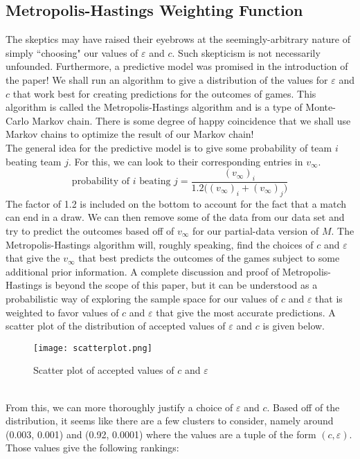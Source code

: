 \documentclass[10pt]{article}
\begin{document}
\subsection{Metropolis-Hastings Weighting Function}
The skeptics may have raised their eyebrows at the seemingly-arbitrary nature of simply ``choosing" our values of $\varepsilon$ and $c$. Such skepticism is not necessarily unfounded. Furthermore, a predictive model was promised in the introduction of the paper! We shall run an algorithm to give a distribution of the values for $\varepsilon$ and $c$ that work best for creating predictions for the outcomes of games. This algorithm is called the Metropolis-Hastings algorithm and is a type of Monte-Carlo Markov chain. There is some degree of happy coincidence that we shall use Markov chains to optimize the result of our Markov chain!\vspace{0.5cm}\\
The general idea for the predictive model is to give some probability of team $i$ beating team $j$. For this, we can look to their corresponding entries in $v_\infty$.
\[\text{probability of $i$ beating $j$} = \frac{(v_\infty)_i}{1.2\big((v_\infty)_i + (v_\infty)_j\big)}\]
The factor of 1.2 is included on the bottom to account for the fact that a match can end in a draw. We can then remove some of the data from our data set and try to predict the outcomes based off of $v_\infty$ for our partial-data version of $M$. The Metropolis-Hastings algorithm will, roughly speaking, find the choices of $c$ and $\varepsilon$ that give the $v_\infty$ that best predicts the outcomes of the games subject to some additional prior information. A complete discussion and proof of Metropolis-Hastings is beyond the scope of this paper, but it can be understood as a probabilistic way of exploring the sample space for our values of $c$ and $\varepsilon$ that is weighted to favor values of $c$ and $\varepsilon$ that give the most accurate predictions. A scatter plot of the distribution of accepted values of $\varepsilon$ and $c$ is given below.
\begin{figure}[h!]
    \centering
    \texttt{[image: scatterplot.png]}
    \caption{Scatter plot of accepted values of $c$ and $\varepsilon$}
    \label{fig:scatterplot}
\end{figure}\\
From this, we can more thoroughly justify a choice of $\varepsilon$ and $c$. Based off of the distribution, it seems like there are a few clusters to consider, namely around (0.003, 0.001) and (0.92, 0.0001) where the values are a tuple of the form $(c,\varepsilon)$. Those values give the following rankings:
\end{document}
